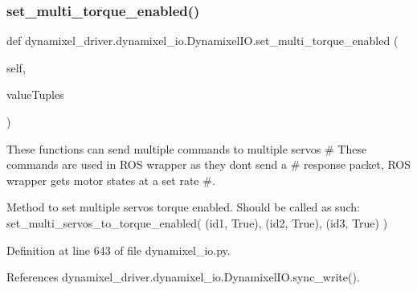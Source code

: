 \subsubsection{\texorpdfstring{set\+\_\+multi\+\_\+torque\+\_\+enabled()}{set\_multi\_torque\_enabled()}}
{\footnotesize\ttfamily def dynamixel\+\_\+driver.\+dynamixel\+\_\+io.\+Dynamixel\+I\+O.\+set\+\_\+multi\+\_\+torque\+\_\+enabled (\begin{DoxyParamCaption}\item[{}]{self,  }\item[{}]{value\+Tuples }\end{DoxyParamCaption})}



These functions can send multiple commands to multiple servos \# These commands are used in R\+OS wrapper as they don\textquotesingle{}t send a \# response packet, R\+OS wrapper gets motor states at a set rate \#. 

\begin{DoxyVerb}Method to set multiple servos torque enabled.
Should be called as such:
set_multi_servos_to_torque_enabled( (id1, True), (id2, True), (id3, True) )
\end{DoxyVerb}
 

Definition at line 643 of file dynamixel\+\_\+io.\+py.



References dynamixel\+\_\+driver.\+dynamixel\+\_\+io.\+Dynamixel\+I\+O.\+sync\+\_\+write().


